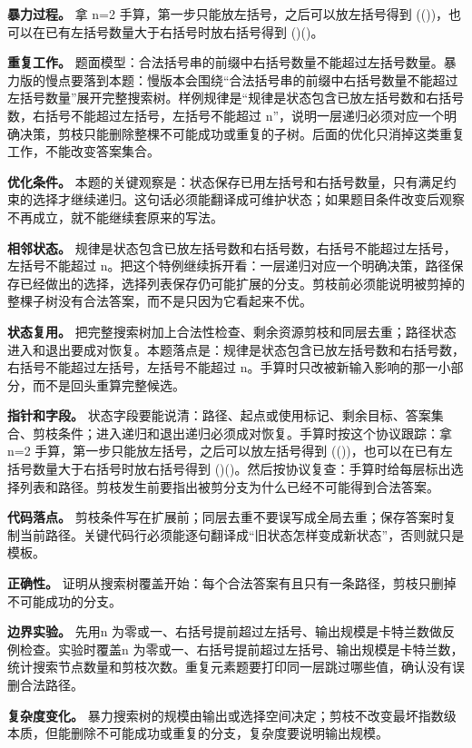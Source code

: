 \textbf{暴力过程。} 拿 n=2 手算，第一步只能放左括号，之后可以放左括号得到 (())，也可以在已有左括号数量大于右括号时放右括号得到 ()()。

\textbf{重复工作。} 题面模型：合法括号串的前缀中右括号数量不能超过左括号数量。暴力版的慢点要落到本题：慢版本会围绕“合法括号串的前缀中右括号数量不能超过左括号数量”展开完整搜索树。样例规律是“规律是状态包含已放左括号数和右括号数，右括号不能超过左括号，左括号不能超过 n”，说明一层递归必须对应一个明确决策，剪枝只能删除整棵不可能成功或重复的子树。后面的优化只消掉这类重复工作，不能改变答案集合。

\textbf{优化条件。} 本题的关键观察是：状态保存已用左括号和右括号数量，只有满足约束的选择才继续递归。这句话必须能翻译成可维护状态；如果题目条件改变后观察不再成立，就不能继续套原来的写法。

\textbf{相邻状态。} 规律是状态包含已放左括号数和右括号数，右括号不能超过左括号，左括号不能超过 n。把这个特例继续拆开看：一层递归对应一个明确决策，路径保存已经做出的选择，选择列表保存仍可能扩展的分支。剪枝前必须能说明被剪掉的整棵子树没有合法答案，而不是只因为它看起来不优。

\textbf{状态复用。} 把完整搜索树加上合法性检查、剩余资源剪枝和同层去重；路径状态进入和退出要成对恢复。本题落点是：规律是状态包含已放左括号数和右括号数，右括号不能超过左括号，左括号不能超过 n。手算时只改被新输入影响的那一小部分，而不是回头重算完整候选。

\textbf{指针和字段。} 状态字段要能说清：路径、起点或使用标记、剩余目标、答案集合、剪枝条件；进入递归和退出递归必须成对恢复。手算时按这个协议跟踪：拿 n=2 手算，第一步只能放左括号，之后可以放左括号得到 (())，也可以在已有左括号数量大于右括号时放右括号得到 ()()。然后按协议复查：手算时给每层标出选择列表和路径。剪枝发生前要指出被剪分支为什么已经不可能得到合法答案。

\textbf{代码落点。} 剪枝条件写在扩展前；同层去重不要误写成全局去重；保存答案时复制当前路径。关键代码行必须能逐句翻译成“旧状态怎样变成新状态”，否则就只是模板。

\textbf{正确性。} 证明从搜索树覆盖开始：每个合法答案有且只有一条路径，剪枝只删掉不可能成功的分支。

\textbf{边界实验。} 先用n 为零或一、右括号提前超过左括号、输出规模是卡特兰数做反例检查。实验时覆盖n 为零或一、右括号提前超过左括号、输出规模是卡特兰数，统计搜索节点数量和剪枝次数。重复元素题要打印同一层跳过哪些值，确认没有误删合法路径。

\textbf{复杂度变化。} 暴力搜索树的规模由输出或选择空间决定；剪枝不改变最坏指数级本质，但能删除不可能成功或重复的分支，复杂度要说明输出规模。

